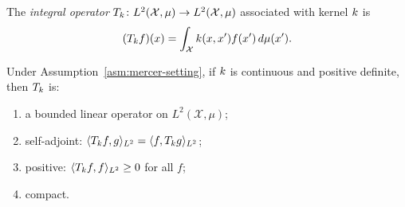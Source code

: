 \documentclass[11pt,a4paper]{article}
\begin{document}
\begin{definition}
\label{def:integral-operator}
The \emph{integral operator} $T_k \colon L^2(\mathcal{X}, \mu)
\to L^2(\mathcal{X}, \mu)$ associated with kernel $k$ is
\begin{equation}
\label{eq:integral-operator}
(T_k f)(x) = \int_{\mathcal{X}} k(x, x') f(x') \,
d\mu(x').
\end{equation}
\end{definition}

\begin{lemma}
\label{lem:integral-op-properties}
Under Assumption~\ref{asm:mercer-setting}, if $k$ is
continuous and positive definite, then $T_k$ is:
\begin{enumerate}[label=(\roman*)]
    \item a bounded linear operator on $L^2(\mathcal{X}, \mu)$;
    \item self-adjoint: $\langle T_k f, g \rangle_{L^2} =
    \langle f, T_k g \rangle_{L^2}$;
    \item positive: $\langle T_k f, f \rangle_{L^2} \ge 0$
    for all $f$;
    \item compact.
\end{enumerate}
\end{lemma}
\end{document}

